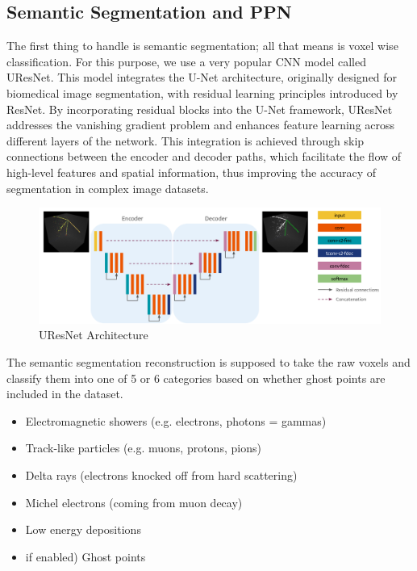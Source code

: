 \subsection{Semantic Segmentation and PPN}

The first thing to handle is semantic segmentation; all that means is  voxel wise classification.
For this purpose, we use a very popular CNN model called UResNet.
This model integrates the U-Net architecture, originally designed for biomedical image segmentation, with residual learning principles introduced by ResNet.
By incorporating residual blocks into the U-Net framework, UResNet addresses the vanishing gradient problem and enhances feature learning across different layers of the network.
This integration is achieved through skip connections between the encoder and decoder paths, which facilitate the flow of high-level features and spatial information, thus improving the accuracy of segmentation in complex image datasets.

\begin{figure}[H]
  \centering
  \includegraphics[width=120mm]{figures/uresnet.png}
  \caption{UResNet Architecture}
  \label{uresnet}
\end{figure}

The semantic segmentation reconstruction is supposed to take the raw voxels and classify them into one of 5 or 6 categories based on whether ghost points are included in the dataset.

\begin{itemize}
\item Electromagnetic showers (e.g. electrons, photons = gammas)

\item Track-like particles (e.g. muons, protons, pions)

\item Delta rays (electrons knocked off from hard scattering)

\item Michel electrons (coming from muon decay)

\item Low energy depositions

\item if enabled) Ghost points

\end{itemize}

